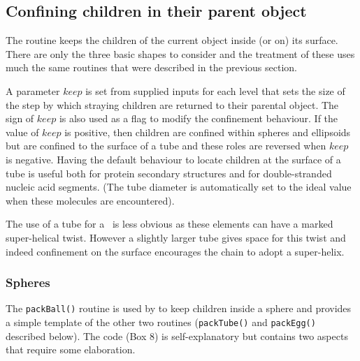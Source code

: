 \subsection{Confining children in their parent object}

The  routine keeps the children of the current object inside (or on) its
surface.  There are only the three basic shapes to consider and the treatment
of these uses much the same routines that were described in the previous section.

A parameter $keep$ is set from supplied inputs for each level that sets
the size of the step by which straying children are returned to their parental
object.   The sign of $keep$ is also used as a flag to modify the confinement
behaviour.  If the value of $keep$ 
is positive, then children are confined within spheres and ellipsoids but
are confined to the surface of a tube and these roles are reversed when
$keep$ is negative.   Having the default behaviour to locate children at the
surface of a tube is useful both for protein secondary structures and for
double-stranded nucleic acid segments.  (The tube diameter is automatically
set to the ideal value when these molecules are encountered).  

The use of a tube for a \Bs\ is less obvious as these elements can have a marked 
super-helical twist. However a slightly larger tube gives space for this twist
and indeed confinement on the surface encourages the chain to adopt a super-helix.   

\subsubsection{Spheres}

The {\tt packBall()} routine is used by  to keep children inside a sphere and
provides a simple template of the other two routines ({\tt packTube()} and {\tt packEgg()}
described below).    The code (Box 8) is self-explanatory but contains two aspects that
require some elaboration.

